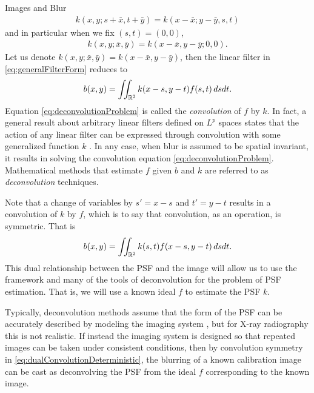 \begin{chapter}{Images and Blur}
\begin{align} 
 k(x,y;s+\bar x,t+\bar y) = k(x-\bar x;y-\bar y,s,t) 
\end{align}
  and in particular when we fix $(s,t) = (0,0)$,
\begin{align} 
 k(x,y;\bar x,\bar y) = k(x-\bar x,y-\bar y;0,0).
\end{align}
  Let us denote $k(x,y;\bar x,\bar y) = k(x-\bar x,y-\bar y)$, then the linear filter in \eqref{eq:generalFilterForm} reduces to   
\begin{equation}\label{eq:deconvolutionProblem}
  b(x,y) = \iint_{\mathbb R^2} k(x-s,y-t) f(s,t)\,dsdt.
\end{equation}
  Equation \eqref{eq:deconvolutionProblem} is called the \emph{convolution} of $f$ by $k$.
  In fact, a general result about arbitrary linear filters defined on $L^p$ spaces states that the action of any linear filter can be expressed through convolution with some generalized function $k$ \citep{grafakos2014}.
  In any case, when blur is assumed to be spatial invariant, it results in solving the convolution equation \eqref{eq:deconvolutionProblem}.
  Mathematical methods that estimate $f$ given $b$ and $k$ are referred to as \emph{deconvolution} techniques.

  Note that a change of variables by $s'=x-s$ and $t'=y-t$ results in a convolution of $k$ by $f$, which is to say that convolution, as an operation, is symmetric.
  That is
\begin{equation}\label{eq:dualConvolutionDeterministic}
  b(x,y) = \iint_{\mathbb R^2} k(s,t) f(x-s,y-t)\,dsdt.
\end{equation}
  This dual relationship between the PSF and the image will allow us to use the framework and many of the tools of deconvolution for the problem of PSF estimation.
  That is, we will use a known ideal $f$ to estimate the PSF $k$.

  Typically, deconvolution methods assume that the form of the PSF can be accurately described by modeling the imaging system \citep{jain1989,hansen2010}, but for X-ray radiography this is not realistic.
  If instead the imaging system is designed so that repeated images can be taken under consistent conditions, then by convolution symmetry in \eqref{eq:dualConvolutionDeterministic}, the blurring of a known calibration image can be cast as deconvolving the PSF from the ideal $f$ corresponding to the known image.


\end{chapter}
